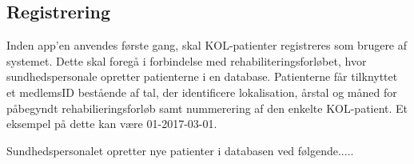 \subsection{Registrering} \label{sec:registrering}
Inden app'en anvendes første gang, skal KOL-patienter registreres som brugere af systemet. Dette skal foregå i forbindelse med rehabiliteringsforløbet, hvor sundhedspersonale opretter patienterne i en database. Patienterne får tilknyttet et medlemsID bestående af tal, der identificere lokalisation, årstal og måned for påbegyndt rehabilieringsforløb samt nummerering af den enkelte KOL-patient. Et eksempel på dette kan være 01-2017-03-01. 

Sundhedspersonalet opretter nye patienter i databasen ved følgende.....